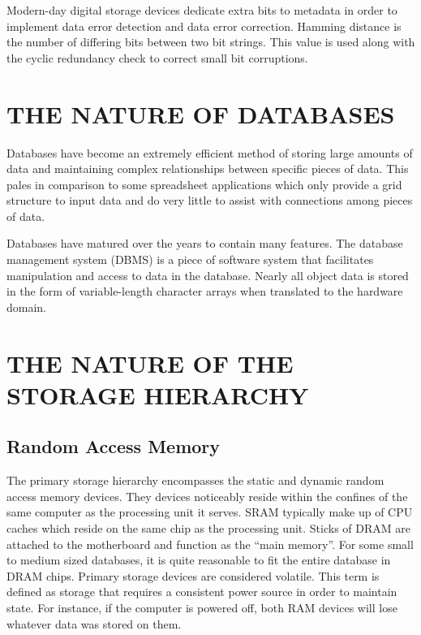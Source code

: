 \documentclass[letterpaper, 10 pt, conference]{ieeeconf}
\begin{document}
Modern-day digital storage devices dedicate extra bits to metadata in order to implement data error detection and data error correction.  Hamming distance is the number of differing bits between two bit strings.  This value is used along with the cyclic redundancy check to correct small bit corruptions.
\newpage

\section{THE NATURE OF DATABASES}
Databases have become an extremely efficient method of storing large amounts of data and maintaining complex relationships between specific pieces of data.  This pales in comparison to some spreadsheet applications which only provide a grid structure to input data and do very little to assist with connections among pieces of data.

Databases have matured over the years to contain many features.  The database management system (DBMS) is a piece of software system that facilitates manipulation and access to data in the database.  Nearly all object data is stored in the form of variable-length character arrays when translated to the hardware domain.

\section{THE NATURE OF THE STORAGE HIERARCHY}

\subsection{Random Access Memory}
The primary storage hierarchy encompasses the static and dynamic random access memory devices.  They devices noticeably reside within the confines of the same computer as the processing unit it serves.  SRAM typically make up of CPU caches which reside on the same chip as the processing unit.  Sticks of DRAM are attached to the motherboard and function as the “main memory”.  For some small to medium sized databases, it is quite reasonable to fit the entire database in DRAM chips.  Primary storage devices are considered volatile.  This term is defined as storage that requires a consistent power source in order to maintain state.  For instance, if the computer is powered off, both RAM devices will lose whatever data was stored on them.
\end{document}
